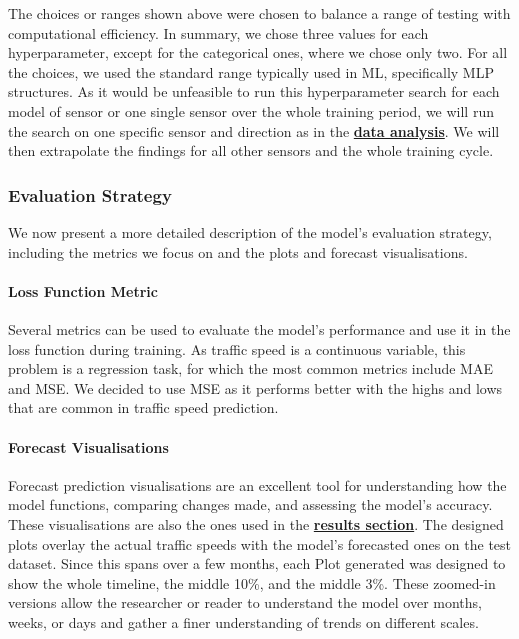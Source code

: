 The choices or ranges shown above were chosen to balance a range of testing with computational efficiency. In summary, we chose three values for each hyperparameter, except for the categorical ones, where we chose only two. For all the choices, we used the standard range typically used in ML, specifically MLP structures. As it would be unfeasible to run this hyperparameter search for each model of sensor or one single sensor over the whole training period, we will run the search on one specific sensor and direction as in the \textbf{\hyperref[link:data-analysis]{data analysis}}. We will then extrapolate the findings for all other sensors and the whole training cycle.

\subsubsection{Evaluation Strategy}
We now present a more detailed description of the model’s evaluation strategy, including the metrics we focus on and the plots and forecast visualisations.

\paragraph{Loss Function Metric}
Several metrics can be used to evaluate the model’s performance and use it in the loss function during training. As traffic speed is a continuous variable, this problem is a regression task, for which the most common metrics include MAE and MSE. We decided to use MSE as it performs better with the highs and lows that are common in traffic speed prediction. 

\paragraph{Forecast Visualisations}
Forecast prediction visualisations are an excellent tool for understanding how the model functions, comparing changes made, and assessing the model’s accuracy. These visualisations are also the ones used in the \textbf{\hyperref[sec:results-discussions]{results section}}. The designed plots overlay the actual traffic speeds with the model’s forecasted ones on the test dataset. Since this spans over a few months, each Plot generated was designed to show the whole timeline, the middle 10\%, and the middle 3\%. These zoomed-in versions allow the researcher or reader to understand the model over months, weeks, or days and gather a finer understanding of trends on different scales.


